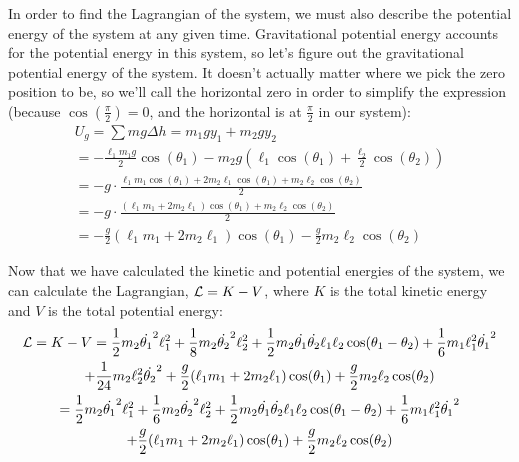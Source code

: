 \documentclass[]{article}
\begin{document}
In order to find the Lagrangian of the system, we must also describe the potential energy of the system at any given time. Gravitational potential energy accounts for the potential energy in this system, so let's figure out the gravitational potential energy of the system. It doesn't actually matter where we pick the zero position to be, so we'll call the horizontal zero in order to simplify the expression (because $\cos(\frac{\pi}{2}) = 0$, and the horizontal is at $\frac{\pi}{2}$ in our system):
\begin{gather*}
	U_g = \sum mg\Delta h = m_1gy_1 + m_2gy_2 \\
	= -\frac{\ell_1m_1g}{2}\cos(\theta_1) - m_2g(\ell_1\cos(\theta_1) + \frac{\ell_2}{2}\cos(\theta_2)) \\
	= -g\cdot\frac{\ell_1m_1\cos(\theta_1) + 2m_2\ell_1\cos(\theta_1) + m_2\ell_2\cos(\theta_2)}{2} \\
	= -g\cdot\frac{(\ell_1m_1 + 2m_2\ell_1)\cos(\theta_1) + m_2\ell_2\cos(\theta_2)}{2} \\
	= -\frac{g}{2}(\ell_1m_1 + 2m_2\ell_1)\cos(\theta_1) - \frac{g}{2}m_2\ell_2\cos(\theta_2)
\end{gather*}

Now that we have calculated the kinetic and potential energies of the system, we can calculate the Lagrangian, $\mathcal{L} = K - V$, where $K$ is the total kinetic energy and $V$ is the total potential energy:
\begin{gather*}
	\mathcal{L} = K - V = \frac12m_2\dot{\theta_1}^2\ell_1^2 + \frac18m_2\dot{\theta_2}^2\ell_2^2 + \frac12m_2\dot{\theta_1}\dot{\theta_2}\ell_1\ell_2\cos(\theta_1 - \theta_2) + \frac16m_1\ell_1^2\dot{\theta_1}^2 \\ + \frac{1}{24}m_2\ell_2^2\dot{\theta_2}^2 + \frac{g}{2}(\ell_1m_1 + 2m_2\ell_1)\cos(\theta_1) + \frac{g}{2}m_2\ell_2\cos(\theta_2) \\
	= \frac12m_2\dot{\theta_1}^2\ell_1^2 + \frac16m_2\dot{\theta_2}^2\ell_2^2 + \frac12m_2\dot{\theta_1}\dot{\theta_2}\ell_1\ell_2\cos(\theta_1 - \theta_2) + \frac16m_1\ell_1^2\dot{\theta_1}^2 \\ + \frac{g}{2}(\ell_1m_1 + 2m_2\ell_1)\cos(\theta_1) + \frac{g}{2}m_2\ell_2\cos(\theta_2)
\end{gather*}
\end{document}
